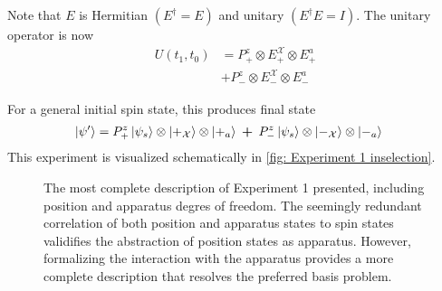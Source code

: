 Note that $E$ is Hermitian $\left(E^\dagger = E\right)$ and unitary $\left( E^\dagger E = I \right)$. The unitary operator is now
\begin{align}
  U(t_1, t_0) &= P^z_+ \otimes E^\mathcal{X}_+ \otimes E^a_+ \\ \nonumber
  &+ P^z_- \otimes E^\mathcal{X}_- \otimes E^a_-
\end{align}

For a general initial spin state, this produces final state
\begin{align}
  \ket{\psi'} &= P^z_+ \ket{\psi_s} \otimes \ket{+_\mathcal{X}} \otimes \ket{+_a} \: \bm{+} \: P^z_- \ket{\psi_s} \otimes \ket{-_\mathcal{X}} \otimes \ket{-_a}
\end{align}
This experiment is visualized schematically in \autoref{fig: Experiment 1 inselection}.

\begin{figure}
\centering\CaptionFontSize
{}
\caption[Insert an abbreviated caption here to show in the List of Figures]
{The most complete description of Experiment 1 presented, including position and apparatus degres of freedom. The seemingly redundant correlation of both position and apparatus states to spin states validifies the abstraction of position states as apparatus. However, formalizing the interaction with the apparatus provides a more complete description that resolves the preferred basis problem.}
\label{fig: Experiment 1 inselection}
\end{figure}

